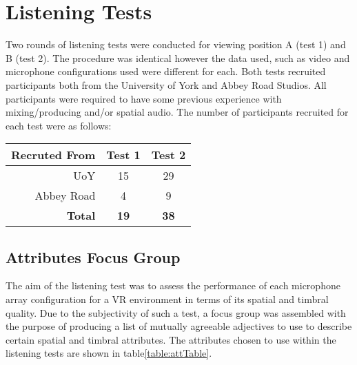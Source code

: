 \section{Listening Tests}

	Two rounds of listening tests were conducted for viewing position A (test 1) and B (test 2). The procedure was identical however the data used, such as video and microphone configurations used were different for each. Both tests recruited participants both from the University of York and Abbey Road Studios. All participants were required to have some previous experience with mixing/producing and/or spatial audio. The number of participants recruited for each test were as follows:

	\begin{center}
		\begin{tabular}{|r |c c|} \hline
			Recruted From & Test 1 & Test 2 \\ \hline
			UoY & 15 & 29 \\
			Abbey Road & 4 & 9 \\ 
			\textbf{Total} & \textbf{19} & \textbf{38} \\\hline
		\end{tabular}
	\end{center}

	\subsection{Attributes Focus Group}
		The aim of the listening test was to assess the performance of each microphone array configuration for a VR environment in terms of its spatial and timbral quality. Due to the subjectivity of such a test, a focus group was assembled with the purpose of producing a list of mutually agreeable adjectives to use to describe certain spatial and timbral attributes. The attributes chosen to use within the listening tests are shown in table\ref{table:attTable}. \\

